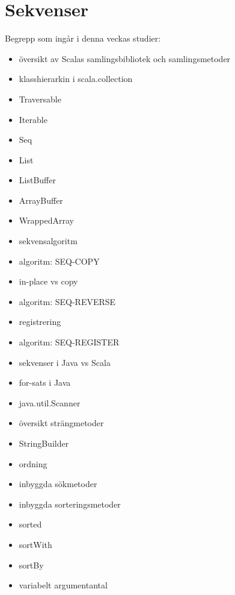 \chapter{Sekvenser}\label{chapter:W06}
Begrepp som ingår i denna veckas studier:
\begin{itemize}[noitemsep,label={$\square$},leftmargin=*]
\item översikt av Scalas samlingsbibliotek och samlingsmetoder
\item klasshierarkin i scala.collection
\item Traversable
\item Iterable
\item Seq
\item List
\item ListBuffer
\item ArrayBuffer
\item WrappedArray
\item sekvensalgoritm
\item algoritm: SEQ-COPY
\item in-place vs copy
\item algoritm: SEQ-REVERSE
\item registrering
\item algoritm: SEQ-REGISTER
\item sekvenser i Java vs Scala
\item for-sats i Java
\item java.util.Scanner
\item översikt strängmetoder
\item StringBuilder
\item ordning
\item inbyggda sökmetoder
\item inbyggda sorteringsmetoder
\item sorted
\item sortWith
\item sortBy
\item variabelt argumentantal\end{itemize}
